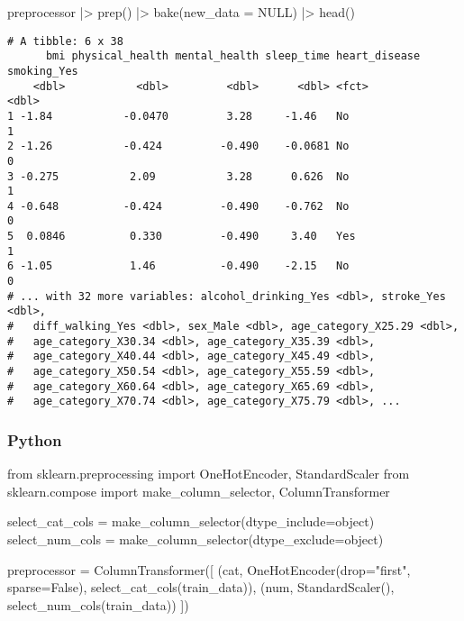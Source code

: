\documentclass[
  letterpaper,
  DIV=11,
  numbers=noendperiod]{scrreprt}
\newenvironment{Shaded}{\begin{snugshade}}{\end{snugshade}}
\newcommand{\AttributeTok}[1]{\textcolor[rgb]{0.40,0.46,0.14}{#1}}
\newcommand{\BuiltInTok}[1]{\textcolor[rgb]{0.00,0.46,0.62}{#1}}
\newcommand{\ConstantTok}[1]{\textcolor[rgb]{0.56,0.35,0.01}{#1}}
\newcommand{\FunctionTok}[1]{\textcolor[rgb]{0.28,0.35,0.67}{#1}}
\newcommand{\ImportTok}[1]{\textcolor[rgb]{0.00,0.46,0.62}{#1}}
\newcommand{\NormalTok}[1]{\textcolor[rgb]{0.00,0.46,0.62}{#1}}
\newcommand{\OperatorTok}[1]{\textcolor[rgb]{0.37,0.37,0.37}{#1}}
\newcommand{\SpecialCharTok}[1]{\textcolor[rgb]{0.37,0.37,0.37}{#1}}
\newcommand{\StringTok}[1]{\textcolor[rgb]{0.13,0.47,0.30}{#1}}
\newcommand{\VariableTok}[1]{\textcolor[rgb]{0.07,0.07,0.07}{#1}}
\begin{document}
\begin{Shaded}
\begin{Highlighting}[]
\NormalTok{preprocessor }\SpecialCharTok{|\textgreater{}} 
    \FunctionTok{prep}\NormalTok{() }\SpecialCharTok{|\textgreater{}} 
    \FunctionTok{bake}\NormalTok{(}\AttributeTok{new\_data =} \ConstantTok{NULL}\NormalTok{) }\SpecialCharTok{|\textgreater{}} 
    \FunctionTok{head}\NormalTok{()}
\end{Highlighting}
\end{Shaded}

\begin{verbatim}
# A tibble: 6 x 38
      bmi physical_health mental_health sleep_time heart_disease smoking_Yes
    <dbl>           <dbl>         <dbl>      <dbl> <fct>               <dbl>
1 -1.84           -0.0470         3.28     -1.46   No                      1
2 -1.26           -0.424         -0.490    -0.0681 No                      0
3 -0.275           2.09           3.28      0.626  No                      1
4 -0.648          -0.424         -0.490    -0.762  No                      0
5  0.0846          0.330         -0.490     3.40   Yes                     1
6 -1.05            1.46          -0.490    -2.15   No                      0
# ... with 32 more variables: alcohol_drinking_Yes <dbl>, stroke_Yes <dbl>,
#   diff_walking_Yes <dbl>, sex_Male <dbl>, age_category_X25.29 <dbl>,
#   age_category_X30.34 <dbl>, age_category_X35.39 <dbl>,
#   age_category_X40.44 <dbl>, age_category_X45.49 <dbl>,
#   age_category_X50.54 <dbl>, age_category_X55.59 <dbl>,
#   age_category_X60.64 <dbl>, age_category_X65.69 <dbl>,
#   age_category_X70.74 <dbl>, age_category_X75.79 <dbl>, ...
\end{verbatim}

\hypertarget{python-61}{%
\subsubsection{Python}\label{python-61}}

\begin{Shaded}
\begin{Highlighting}[]
\ImportTok{from}\NormalTok{ sklearn.preprocessing }\ImportTok{import}\NormalTok{ OneHotEncoder, StandardScaler}
\ImportTok{from}\NormalTok{ sklearn.compose }\ImportTok{import}\NormalTok{ make\_column\_selector, ColumnTransformer}

\NormalTok{select\_cat\_cols }\OperatorTok{=}\NormalTok{ make\_column\_selector(dtype\_include}\OperatorTok{=}\BuiltInTok{object}\NormalTok{)}
\NormalTok{select\_num\_cols }\OperatorTok{=}\NormalTok{ make\_column\_selector(dtype\_exclude}\OperatorTok{=}\BuiltInTok{object}\NormalTok{)}

\NormalTok{preprocessor }\OperatorTok{=}\NormalTok{ ColumnTransformer([}
\NormalTok{    (}\StringTok{\textquotesingle{}cat\textquotesingle{}}\NormalTok{, OneHotEncoder(drop}\OperatorTok{=}\StringTok{"first"}\NormalTok{, sparse}\OperatorTok{=}\VariableTok{False}\NormalTok{), select\_cat\_cols(train\_data)),}
\NormalTok{    (}\StringTok{\textquotesingle{}num\textquotesingle{}}\NormalTok{, StandardScaler(), select\_num\_cols(train\_data))}
\NormalTok{])}
\end{Highlighting}
\end{Shaded}
\end{document}
